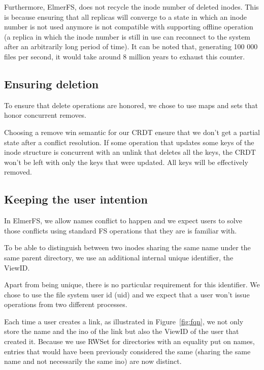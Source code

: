 \documentclass[sigconf,anonymous,10pt]{acmart}
\begin{document}
Furthermore, ElmerFS, does not recycle the inode number of deleted inodes.
This is because ensuring that all replicas will converge to a state in which
an inode number is not used anymore is not compatible with supporting offline
operation (a replica in which the inode number is still in use can reconnect
to the system after an arbitrarily long period of time).
It can be noted that, generating 100 000 files per second, it would take around
8 million years to exhaust this counter.

\subsection{Ensuring deletion}

\label{sec:deletion}
To ensure that delete operations are honored, we chose to use maps and sets that
honor concurrent removes.

Choosing a remove win semantic for our CRDT ensure that we don't get a partial
state after a conflict resolution. If some operation that updates some keys of the
inode structure is concurrent with an unlink that deletes all the keys, the
CRDT won't be left with only the keys that were updated.
All keys will be effectively removed.

\subsection{Keeping the user intention}

In ElmerFS, we allow names conflict to happen and we expect users to solve
those conflicts using standard FS operations that they are is familiar with.

To be able to distinguish between two inodes sharing the same name under
the same parent directory, we use an additional internal unique identifier,
the ViewID.

Apart from being unique, there is no particular requirement for this identifier.
We chose to use the file system user id (uid) and we expect that a
user won’t issue operations from two different processes.

Each time a user creates a link, as illustrated in Figure~\ref{fig:fqn},
we not only store the name and the ino of the link but also the ViewID of the user that created it.
Because we use RWSet for directories with an equality put on names,
entries that would have been previously considered the same
(sharing the same name and not necessarily the same ino) are now distinct.
\end{document}
